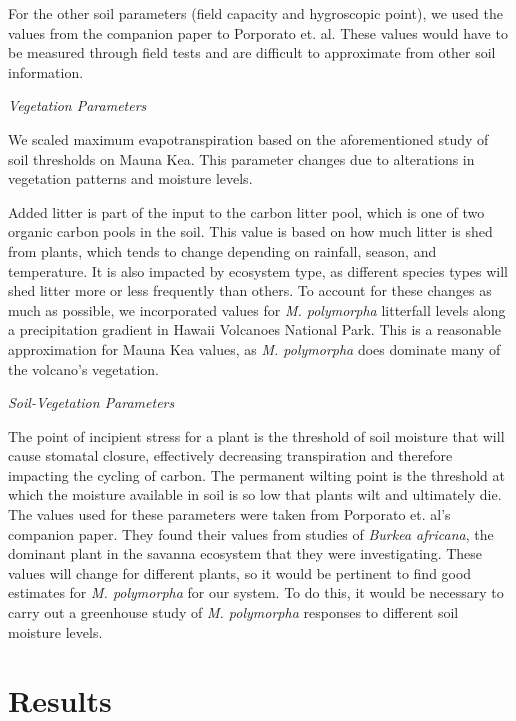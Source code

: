 \documentclass[12pt, letterpaper]{article}
\begin{document}
For the other soil parameters (field capacity and hygroscopic point), we used the values from the companion paper to Porporato et. al. \cite{dodorico_hydrologic_2003} These values would have to be measured through field tests and are difficult to approximate from other soil information.


\emph{Vegetation Parameters}

We scaled maximum evapotranspiration based on the aforementioned study of soil thresholds on Mauna Kea. \cite{bateman_quantitative_2019} This parameter changes due to alterations in vegetation patterns and moisture levels. 

Added litter is part of the input to the carbon litter pool, which is one of two organic carbon pools in the soil. This value is based on how much litter is shed from plants, which tends to change depending on rainfall, season, and temperature. It is also impacted by ecosystem type, as different species types will shed litter more or less frequently than others. To account for these changes as much as possible, we incorporated values for \textit{M. polymorpha} litterfall levels along a precipitation gradient in Hawaii Volcanoes National Park. \cite{austin_precipitation_2000} This is a reasonable approximation for Mauna Kea values, as \textit{M. polymorpha} does dominate many of the volcano’s vegetation. \cite{bateman_quantitative_2019}

\emph{Soil-Vegetation Parameters}

The point of incipient stress for a plant is the threshold of soil moisture that will cause stomatal closure, effectively decreasing transpiration and therefore impacting the cycling of carbon. The permanent wilting point is the threshold at which the moisture available in soil is so low that plants wilt and ultimately die. The values used for these parameters were taken from Porporato et. al’s companion paper. \cite{dodorico_hydrologic_2003} They found their values from studies of \textit{Burkea africana}, the dominant plant in the savanna ecosystem that they were investigating. \cite{dodorico_hydrologic_2003} These values will change for different plants, so it would be pertinent to find good estimates for \textit{M. polymorpha} for our system. To do this, it would be necessary to carry out a greenhouse study of \textit{M. polymorpha} responses to different soil moisture levels.


\section{Results}
\end{document}
